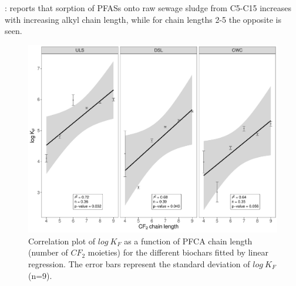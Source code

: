 \citep{zhang2013sorption}: reports that sorption of PFASs onto raw sewage sludge from C5-C15 increases with increasing alkyl chain length, while for chain lengths 2-5 the opposite is seen. 

\begin{figure}
    \centering
    \includegraphics[width=\textwidth]{R/figs/chainlength_KF.pdf}
    \caption{Correlation plot of $log~K_F$ as a function of PFCA chain length (number of $CF_2$ moieties) for the different biochars fitted by linear regression. The error bars represent the standard deviation of $log~ K_F$ (n=9).}
    \label{fig:chainlength}
\end{figure}

